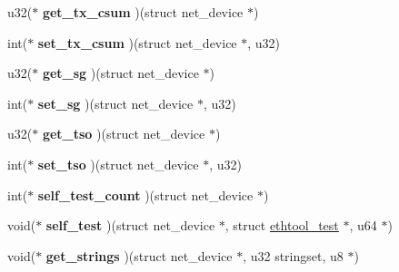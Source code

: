 \begin{DoxyCompactItemize}
\item 
\hypertarget{struct__kc__ethtool__ops_ade6ce76a1088136d934f1d556c58ef0f}{
u32($\ast$ {\bfseries get\_\-tx\_\-csum} )(struct net\_\-device $\ast$)}
\label{struct__kc__ethtool__ops_ade6ce76a1088136d934f1d556c58ef0f}

\item 
\hypertarget{struct__kc__ethtool__ops_a3df0145c14084bd57660348a23301ed9}{
int($\ast$ {\bfseries set\_\-tx\_\-csum} )(struct net\_\-device $\ast$, u32)}
\label{struct__kc__ethtool__ops_a3df0145c14084bd57660348a23301ed9}

\item 
\hypertarget{struct__kc__ethtool__ops_abc09611fd5fa375008a4d1e5605ae0fb}{
u32($\ast$ {\bfseries get\_\-sg} )(struct net\_\-device $\ast$)}
\label{struct__kc__ethtool__ops_abc09611fd5fa375008a4d1e5605ae0fb}

\item 
\hypertarget{struct__kc__ethtool__ops_accb1b393b636875df5705bae4eeec2f5}{
int($\ast$ {\bfseries set\_\-sg} )(struct net\_\-device $\ast$, u32)}
\label{struct__kc__ethtool__ops_accb1b393b636875df5705bae4eeec2f5}

\item 
\hypertarget{struct__kc__ethtool__ops_ab326e4b963934af752e5b34ec16f5fab}{
u32($\ast$ {\bfseries get\_\-tso} )(struct net\_\-device $\ast$)}
\label{struct__kc__ethtool__ops_ab326e4b963934af752e5b34ec16f5fab}

\item 
\hypertarget{struct__kc__ethtool__ops_ab3957845e910a8d36a871c3c34e87141}{
int($\ast$ {\bfseries set\_\-tso} )(struct net\_\-device $\ast$, u32)}
\label{struct__kc__ethtool__ops_ab3957845e910a8d36a871c3c34e87141}

\item 
\hypertarget{struct__kc__ethtool__ops_a4d34dbaf4f67a139d523b18ff336015b}{
int($\ast$ {\bfseries self\_\-test\_\-count} )(struct net\_\-device $\ast$)}
\label{struct__kc__ethtool__ops_a4d34dbaf4f67a139d523b18ff336015b}

\item 
\hypertarget{struct__kc__ethtool__ops_aff9a9b26fc1d5f63b56052fabe746bd5}{
void($\ast$ {\bfseries self\_\-test} )(struct net\_\-device $\ast$, struct \hyperlink{structethtool__test}{ethtool\_\-test} $\ast$, u64 $\ast$)}
\label{struct__kc__ethtool__ops_aff9a9b26fc1d5f63b56052fabe746bd5}

\item 
\hypertarget{struct__kc__ethtool__ops_ab95ab5734664a47d7c956714a168d187}{
void($\ast$ {\bfseries get\_\-strings} )(struct net\_\-device $\ast$, u32 stringset, u8 $\ast$)}
\label{struct__kc__ethtool__ops_ab95ab5734664a47d7c956714a168d187}


\end{DoxyCompactItemize}
